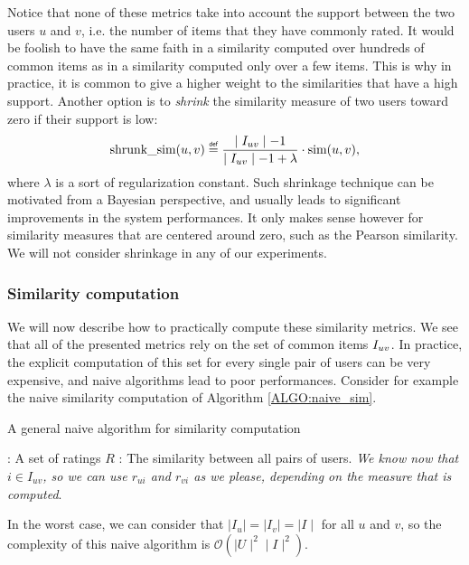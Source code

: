 Notice that none of these metrics take into account the support between the two
users $u$ and $v$, i.e. the number of items that they have commonly rated. It
would be foolish to have the same faith in a similarity computed over hundreds
of common items as in a similarity computed only over a few items. This is why
in practice, it is common to give a higher weight to the similarities that have
a high support. Another option is to \textit{shrink} the similarity measure of
two users toward zero if their support is low:
$$\text{shrunk\_sim}(u, v) \eqdef \frac{\mid \Iuv \mid - 1}{\mid \Iuv \mid - 1
+ \lambda} \cdot \ssim(u, v),$$
where $\lambda$ is a sort of regularization constant. Such shrinkage technique
can be motivated from a Bayesian perspective, and usually leads to significant
improvements in the system performances. It only makes sense however for
similarity measures that are centered around zero, such as the Pearson
similarity. We will not consider shrinkage in any of our experiments.

\subsubsection{Similarity computation}

We will now describe how to practically compute these similarity metrics. We
see that all of the presented metrics rely on the set of common items $I_{uv}$.
In practice, the explicit computation of this set for every single pair of
users can be very expensive, and naive algorithms lead to poor performances.
Consider for example the naive similarity computation of Algorithm
\ref{ALGO:naive_sim}.
\begin{algorithm}[!ht]
 \caption{A general naive algorithm for similarity computation}
       \label{ALGO:naive_sim}
       \begin{algorithmic}

         : A set of ratings $R$
         : The similarity between all pairs of users.
         \STATE \textit{We know now that $i \in I_{uv}$, so we can use $r_{ui}$
         and $r_{vi}$ as we please, depending on the measure that is computed}.
         \ENDIF
        \ENDFOR
        \ENDFOR
        \ENDFOR
\end{algorithmic}
\end{algorithm}
In the worst case, we can consider that $\mid I_u \mid = \mid I_v \mid = \mid I
\mid$ for all $u$ and $v$, so the complexity of this naive algorithm is
$\mathcal{O}(\mid U \mid^2 \mid I \mid^2)$.

